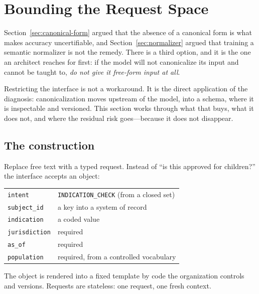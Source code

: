 \section{Bounding the Request Space}
\label{ch:bounded-requests}
\label{sec:bounded}

Section~\ref{sec:canonical-form} argued that the absence of a canonical form is what
makes accuracy uncertifiable, and Section~\ref{sec:normalizer} argued that training a
semantic normalizer is not the remedy. There is a third option, and it is the one an
architect reaches for first: if the model will not canonicalize its input and cannot
be taught to, \emph{do not give it free-form input at all}.

Restricting the interface is not a workaround. It is the direct application of the
diagnosis: canonicalization moves upstream of the model, into a schema, where it is
inspectable and versioned. This section works through what that buys, what it does
not, and where the residual risk goes---because it does not disappear.

\subsection{The construction}

Replace free text with a typed request. Instead of ``is this approved for children?''
the interface accepts an object:

\begin{center}
\small
\begin{tabular}{@{}l>{\raggedright\arraybackslash}p{7.2cm}@{}}
\toprule
\texttt{intent} & \texttt{INDICATION\_CHECK} (from a closed set) \\
\texttt{subject\_id} & a key into a system of record \\
\texttt{indication} & a coded value \\
\texttt{jurisdiction} & required \\
\texttt{as\_of} & required \\
\texttt{population} & required, from a controlled vocabulary \\
\bottomrule
\end{tabular}
\end{center}

The object is rendered into a fixed template by code the organization controls and
versions. Requests are stateless: one request, one fresh context.

